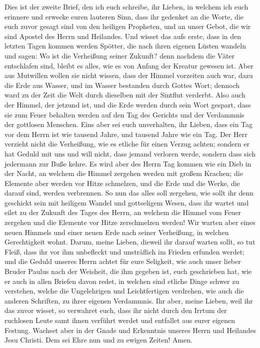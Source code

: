  Dies ist der zweite Brief, den ich euch schreibe, ihr
Lieben, in welchem ich euch erinnere und erwecke euren lauteren Sinn,
 dass ihr gedenket an die Worte, die euch zuvor gesagt
sind von den heiligen Propheten, und an unser Gebot, die wir sind
Apostel des Herrn und Heilandes.  Und wisset das aufs
erste, dass in den letzten Tagen kommen werden Spötter, die nach ihren
eigenen Lüsten wandeln  und sagen: Wo ist die Verheißung
seiner Zukunft? denn nachdem die Väter entschlafen sind, bleibt es
alles, wie es von Anfang der Kreatur gewesen ist.  Aber
aus Mutwillen wollen sie nicht wissen, dass der Himmel vorzeiten auch
war, dazu die Erde aus Wasser, und im Wasser bestanden durch Gottes
Wort;  dennoch ward zu der Zeit die Welt durch dieselben
mit der Sintflut verderbt.  Also auch der Himmel, der
jetzund ist, und die Erde werden durch sein Wort gespart, dass sie zum
Feuer behalten werden auf den Tag des Gerichts und der Verdammnis der
gottlosen Menschen.  Eins aber sei euch unverhalten, ihr
Lieben, dass ein Tag vor dem Herrn ist wie tausend Jahre, und tausend
Jahre wie ein Tag.  Der Herr verzieht nicht die
Verheißung, wie es etliche für einen Verzug achten; sondern er hat
Geduld mit uns und will nicht, dass jemand verloren werde, sondern dass
sich jedermann zur Buße kehre.  Es wird aber des Herrn
Tag kommen wie ein Dieb in der Nacht, an welchem die Himmel zergehen
werden mit großem Krachen; die Elemente aber werden vor Hitze schmelzen,
und die Erde und die Werke, die darauf sind, werden verbrennen.
 So nun das alles soll zergehen, wie sollt ihr denn
geschickt sein mit heiligem Wandel und gottseligem Wesen,
 dass ihr wartet und eilet zu der Zukunft des Tages des
Herrn, an welchem die Himmel vom Feuer zergehen und die Elemente vor
Hitze zerschmelzen werden!  Wir warten aber eines neuen
Himmels und einer neuen Erde nach seiner Verheißung, in welchen
Gerechtigkeit wohnt.  Darum, meine Lieben, dieweil ihr
darauf warten sollt, so tut Fleiß, dass ihr vor ihm unbefleckt und
unsträflich im Frieden erfunden werdet;  und die Geduld
unseres Herrn achtet für eure Seligkeit, wie auch unser lieber Bruder
Paulus nach der Weisheit, die ihm gegeben ist, euch geschrieben hat,
 wie er auch in allen Briefen davon redet, in welchen
sind etliche Dinge schwer zu verstehen, welche die Ungelehrigen und
Leichtfertigen verdrehen, wie auch die anderen Schriften, zu ihrer
eigenen Verdammnis.  Ihr aber, meine Lieben, weil ihr das
zuvor wisset, so verwahret euch, dass ihr nicht durch den Irrtum der
ruchlosen Leute samt ihnen verführt werdet und entfallet aus eurer
eigenen Festung.  Wachset aber in der Gnade und
Erkenntnis unseres Herrn und Heilandes Jesu Christi. Dem sei Ehre nun
und zu ewigen Zeiten! Amen.
